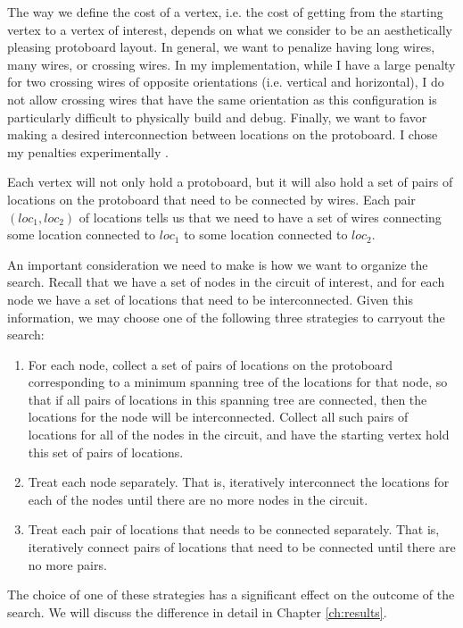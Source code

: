 The way we define the cost of a vertex, i.e. the cost of getting from the
starting vertex to a vertex of interest, depends on what we consider to be an
aesthetically pleasing protoboard layout. In general, we want to penalize having
long wires, many wires, or crossing wires. In my implementation, while I have
a large penalty for two crossing wires of opposite orientations (i.e. vertical
and horizontal), I do not allow crossing wires that have the same orientation as
this configuration is particularly difficult to physically build and debug.
Finally, we want to favor making a desired interconnection between locations
on the protoboard. I chose my penalties experimentally
\q.

Each vertex will not only hold a protoboard, but it will also hold a set of
pairs of locations on the protoboard that need to be connected by wires. Each
pair $(loc_1, loc_2)$ of locations tells us that we need to have a set of wires
connecting some location connected to $loc_1$ to some location connected to
$loc_2$.

An important consideration we need to make is how we want to organize the
search. Recall that we have a set of nodes in the circuit of interest, and for
each node we have a set of locations that need to be interconnected. Given this
information, we may choose one of the following three strategies to carryout the
search:

\begin{enumerate}
\item For each node, collect a set of pairs of locations on the protoboard
corresponding to a minimum spanning tree of the locations for that node, so that
if all pairs of locations in this spanning tree are connected, then the
locations for the node will be interconnected. Collect all such pairs of
locations for all of the nodes in the circuit, and have the starting vertex hold
this set of pairs of locations.
\item Treat each node separately. That is, iteratively interconnect the
locations for each of the nodes until there are no more nodes in the circuit.
\item Treat each pair of locations that needs to be connected separately. That
is, iteratively connect pairs of locations that need to be connected until there
are no more pairs.
\end{enumerate}

The choice of one of these strategies has a significant effect on the outcome of
the search. We will discuss the difference in detail in Chapter
\ref{ch:results}.

